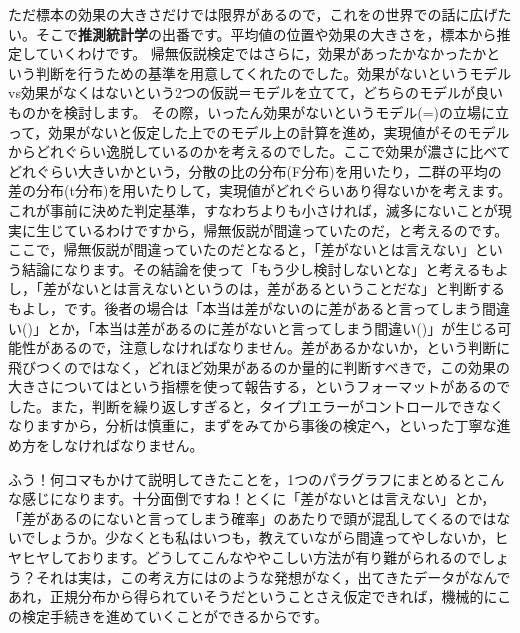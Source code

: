 \documentclass{ltjbook}
\begin{document}
ただ標本の効果の大きさだけでは限界があるので，これをの世界での話に広げたい。そこで\textbf{推測統計学}の出番です。平均値の位置や効果の大きさを，標本から推定していくわけです。
帰無仮説検定ではさらに，効果があったかなかったかという判断を行うための基準を用意してくれたのでした。効果がないというモデルvs効果がなくはないという2つの仮説＝モデルを立てて，どちらのモデルが良いものかを検討します。
その際，いったん効果がないというモデル(=)の立場に立って，効果がないと仮定した上でのモデル上の計算を進め，実現値がそのモデルからどれぐらい逸脱しているのかを考えるのでした。ここで効果が濃さに比べてどれぐらい大きいかという，分散の比の分布(F分布)を用いたり，二群の平均の差の分布(t分布)を用いたりして，実現値がどれぐらいあり得ないかを考えます。これが事前に決めた判定基準，すなわちよりも小さければ，滅多にないことが現実に生じているわけですから，帰無仮説が間違っていたのだ，と考えるのです。ここで，帰無仮説が間違っていたのだとなると，「差がないとは言えない」という結論になります。その結論を使って「もう少し検討しないとな」と考えるもよし，「差がないとは言えないというのは，差があるということだな」と判断するもよし，です。後者の場合は「本当は差がないのに差があると言ってしまう間違い()」とか，「本当は差があるのに差がないと言ってしまう間違い()」が生じる可能性があるので，注意しなければなりません。差があるかないか，という判断に飛びつくのではなく，どれほど効果があるのか量的に判断すべきで，この効果の大きさについてはという指標を使って報告する，というフォーマットがあるのでした。また，判断を繰り返しすぎると，タイプ1エラーがコントロールできなくなりますから，分析は慎重に，まずをみてから事後の検定へ，といった丁寧な進め方をしなければなりません。

ふう！何コマもかけて説明してきたことを，1つのパラグラフにまとめるとこんな感じになります。十分面倒ですね！とくに「差がないとは言えない」とか，「差があるのにないと言ってしまう確率」のあたりで頭が混乱してくるのではないでしょうか。少なくとも私はいつも，教えていながら間違ってやしないか，ヒヤヒヤしております。どうしてこんなややこしい方法が有り難がられるのでしょう？それは実は，この考え方にはのような発想がなく，出てきたデータがなんであれ，正規分布から得られていそうだということさえ仮定できれば，機械的にこの検定手続きを進めていくことができるからです。
\end{document}
